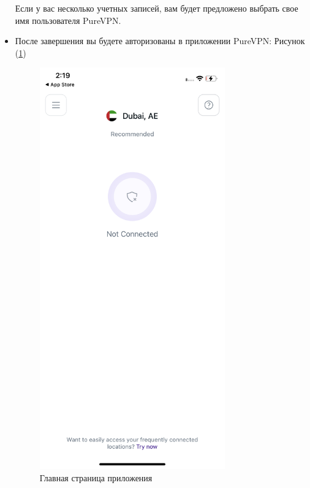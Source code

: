 \begin{itemize}
Если у вас несколько учетных записей, вам будет предложено выбрать свое имя пользователя PureVPN.
\item После завершения вы будете авторизованы в приложении PureVPN:  Рисунок (\ref{fig:61})
\begin{figure}[H]
\includegraphics[width=8cm]{47.png}
\centering
\caption{Главная страница приложения}
\label{fig:61}
\end{figure}
\end{itemize}

